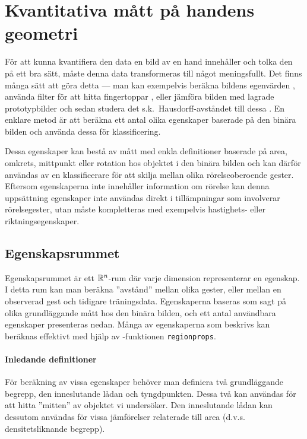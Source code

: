 \documentclass[../rapport_MVEX01-11-05]{subfiles}
\begin{document}
\section{Kvantitativa mått på handens geometri}\label{sec:features}
För att kunna kvantifiera den data en bild av en hand 
innehåller och tolka den på ett bra sätt, måste denna data transformeras till
något meningsfullt. Det finns många sätt att göra detta --- man kan exempelvis
beräkna bildens egenvärden \cite{Funck02}, använda filter för att hitta
fingertoppar \cite{Noelker97}, eller jämföra bilden med lagrade prototypbilder
och sedan studera det s.k.~Hausdorff-avståndet till dessa \cite{Nielsen04}.
En enklare metod
är att beräkna ett antal olika egenskaper baserade på den binära bilden
och använda dessa för klassificering.

Dessa egenskaper kan bestå av mått med enkla definitioner baserade på area,
omkrets, mittpunkt eller rotation hos objektet i den binära bilden och kan
därför användas av en klassificerare för att skilja mellan olika rörelseoberoende
gester. Eftersom egenskaperna inte innehåller information om rörelse kan denna
uppsättning egenskaper inte användas direkt i tillämpningar som involverar
rörelsegester, utan måste kompletteras med exempelvis hastighets- eller
riktningsegenskaper.

\subsection{Egenskapsrummet}
Egenskapsrummet är ett $\mathbb{R}^n$-rum där varje dimension representerar en
egenskap. I detta rum kan man beräkna ''avstånd'' mellan olika gester,
eller mellan en observerad gest och tidigare träningsdata. Egenskaperna baseras som sagt
på olika grundläggande mått hos den binära bilden, och ett antal användbara
egenskaper presenteras nedan.
Många av egenskaperna som beskrivs kan beräknas effektivt med hjälp av
\MATLAB-funktionen \texttt{regionprops}.

\paragraph{Inledande definitioner}

För beräkning av vissa egenskaper behöver man definiera två
grundläggande begrepp, den inneslutande lådan och tyngdpunkten. Dessa
två kan användas för att hitta ''mitten'' av objektet
vi undersöker. Den inneslutande lådan kan dessutom användas för vissa
jämförelser relaterade till area (d.v.s. densitetsliknande begrepp).
\end{document}
